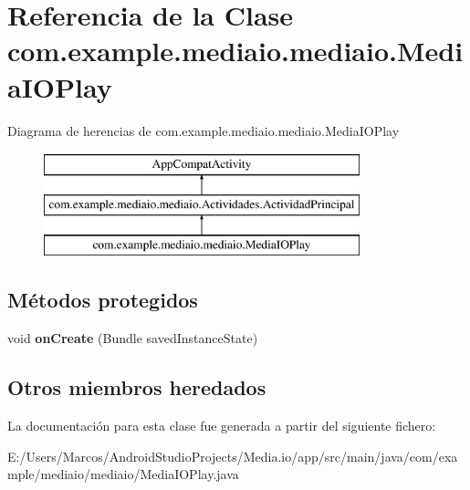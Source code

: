 \hypertarget{classcom_1_1example_1_1mediaio_1_1mediaio_1_1_media_i_o_play}{}\section{Referencia de la Clase com.\+example.\+mediaio.\+mediaio.\+Media\+I\+O\+Play}
\label{classcom_1_1example_1_1mediaio_1_1mediaio_1_1_media_i_o_play}
Diagrama de herencias de com.\+example.\+mediaio.\+mediaio.\+Media\+I\+O\+Play\begin{figure}[H]
\begin{center}
\leavevmode
\includegraphics[height=3.000000cm]{classcom_1_1example_1_1mediaio_1_1mediaio_1_1_media_i_o_play}
\end{center}
\end{figure}
\subsection*{Métodos protegidos}
\begin{DoxyCompactItemize}
\item 
\mbox{\label{classcom_1_1example_1_1mediaio_1_1mediaio_1_1_media_i_o_play_a8d734a36933c7f26b4b2d77453f74d94}} 
void {\bfseries on\+Create} (Bundle saved\+Instance\+State)
\end{DoxyCompactItemize}
\subsection*{Otros miembros heredados}


La documentación para esta clase fue generada a partir del siguiente fichero\+:\begin{DoxyCompactItemize}
\item 
E\+:/\+Users/\+Marcos/\+Android\+Studio\+Projects/\+Media.\+io/app/src/main/java/com/example/mediaio/mediaio/Media\+I\+O\+Play.\+java\end{DoxyCompactItemize}
